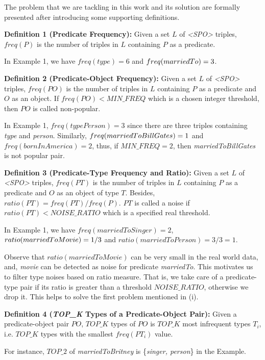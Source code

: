 \documentclass{acm_proc_article-sp}
\begin{document}
The problem that we are tackling in this work and its solution are formally presented after introducing some supporting definitions.

\textbf{Definition 1 (Predicate Frequency):} Given a set $L$ of \textit{<SPO>} triples, $freq(P)$ is the number of triples in $L$ containing $P$ as a predicate.

In Example 1, we have $freq(type) = 6$ and $freq(marriedTo)\\ = 3$.

\textbf{Definition 2 (Predicate-Object Frequency):} Given a set $L$ of \textit{<SPO>} triples, $freq(PO)$ is the number of triples in $L$ containing $P$ as a predicate and $O$ as an object. If $freq(PO) < MIN\_FREQ$ which is a chosen integer threshold, then $PO$ is called non-popular.

In Example 1, $freq(typePerson) = 3$ since there are three triples containing \textit{type} and \textit{person}. Similarly, $freq(married\\ToBillGates) = 1$ and $freq(bornInAmerica) = 2$, thus, if $MIN\_FREQ = 2$, then \textit{marriedToBillGates} is not popular pair.

\textbf{Definition 3 (Predicate-Type Frequency and Ratio):} Given a set $L$ of \textit{<SPO>} triples, $freq(PT)$ is the number of triples in $L$ containing $P$ as a predicate and $O$ as an object of type $T$. Besides, $ratio(PT) = freq(PT) / freq(P)$. $PT$ is called a noise if $ratio(PT) < NOISE\_RATIO$ which is a specified real threshold.

In Example 1, we have $freq(marriedToSinger) = 2$, $ratio\\(marriedToMovie) = 1 / 3$ and $ratio(marriedToPerson) = 3 / 3 = 1$.

Observe that $ratio(marriedToMovie)$ can be very small in the real world data, and, \textit{movie} can be detected as noise for predicate \textit{marriedTo}. This motivates us to filter type noises based on ratio measure. That is, we take care of a predicate-type pair if its ratio is greater than a threshold $NOISE\_RATIO$, otherwise we drop it. This helps to solve the first problem mentioned in (i).

\textbf{Definition 4 (\textit{TOP\_K} Types of a Predicate-Object Pair):} Given a predicate-object pair $PO$, $TOP\_K$ types of $PO$ is $TOP\_K$ most infrequent types $T_{i}$, i.e. $TOP\_K$ types with the smallest $freq(PT_{i})$ value.

For instance, $TOP\_2$ of \textit{marriedToBritney} is \{\textit{singer, person}\} in the Example.
\end{document}
